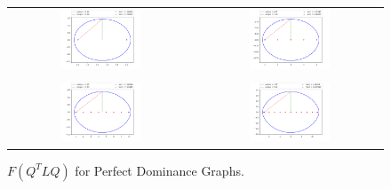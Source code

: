 \documentclass{article}
\begin{document}
\begin{figure}[ht]
\centering
\begin{tabular}{cc}
\includegraphics[width=0.45\textwidth]{figures/nr-dom-ellipse-3.png}
&
\includegraphics[width=0.45\textwidth]{figures/nr-dom-ellipse-6.png} \\
& \\
\includegraphics[width=0.45\textwidth]{figures/nr-dom-ellipse-9.png}
&
\includegraphics[width=0.45\textwidth]{figures/nr-dom-ellipse-12.png} \\
\end{tabular}
\caption{$F(Q^{T}LQ)$ for Perfect Dominance Graphs.}
\end{figure}
\end{document}
